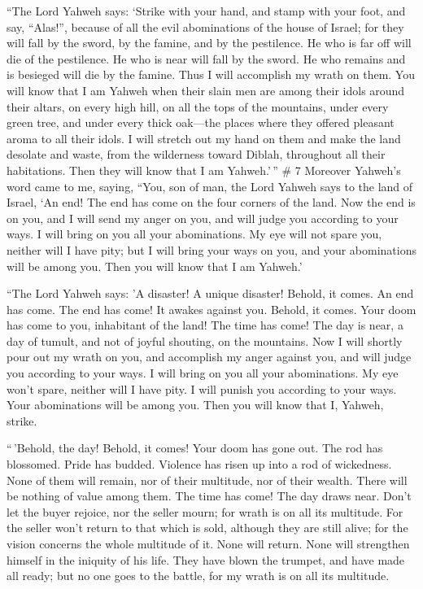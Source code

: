  ``The Lord Yahweh says: `Strike with your hand, and
stamp with your foot, and say, ``Alas!'', because of all the evil
abominations of the house of Israel; for they will fall by the sword, by
the famine, and by the pestilence.  He who is far off
will die of the pestilence. He who is near will fall by the sword. He
who remains and is besieged will die by the famine. Thus I will
accomplish my wrath on them.  You will know that I am
Yahweh when their slain men are among their idols around their altars,
on every high hill, on all the tops of the mountains, under every green
tree, and under every thick oak---the places where they offered pleasant
aroma to all their idols.  I will stretch out my hand on
them and make the land desolate and waste, from the wilderness toward
Diblah, throughout all their habitations. Then they will know that I am
Yahweh.'\,'' \# 7  Moreover Yahweh's word came to me,
saying,  ``You, son of man, the Lord Yahweh says to the
land of Israel, `An end! The end has come on the four corners of the
land.  Now the end is on you, and I will send my anger on
you, and will judge you according to your ways. I will bring on you all
your abominations.  My eye will not spare you, neither
will I have pity; but I will bring your ways on you, and your
abominations will be among you. Then you will know that I am Yahweh.'

 ``The Lord Yahweh says: 'A disaster! A unique disaster!
Behold, it comes.  An end has come. The end has come! It
awakes against you. Behold, it comes.  Your doom has come
to you, inhabitant of the land! The time has come! The day is near, a
day of tumult, and not of joyful shouting, on the mountains.
 Now I will shortly pour out my wrath on you, and
accomplish my anger against you, and will judge you according to your
ways. I will bring on you all your abominations.  My eye
won't spare, neither will I have pity. I will punish you according to
your ways. Your abominations will be among you. Then you will know that
I, Yahweh, strike.

 ``\,'Behold, the day! Behold, it comes! Your doom has
gone out. The rod has blossomed. Pride has budded. 
Violence has risen up into a rod of wickedness. None of them will
remain, nor of their multitude, nor of their wealth. There will be
nothing of value among them.  The time has come! The day
draws near. Don't let the buyer rejoice, nor the seller mourn; for wrath
is on all its multitude.  For the seller won't return to
that which is sold, although they are still alive; for the vision
concerns the whole multitude of it. None will return. None will
strengthen himself in the iniquity of his life.  They
have blown the trumpet, and have made all ready; but no one goes to the
battle, for my wrath is on all its multitude.

